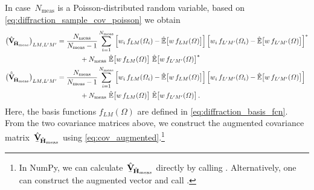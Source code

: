 In case~$N_\text{meas}$ is a Poisson-distributed random variable,
based on \cref{eq:diffraction_sample_cov_poisson} we obtain
\begin{align}
  \rBrk[1]{\covMatEstSym_{\!\hat{\vect{H}}_\text{meas}}}_{L M, L' M'}
  ={}& \frac{N_\text{meas}}{N_\text{meas} - 1} \sum_{i = 1}^{N_\text{meas}}
  \sBrk[2]{w_i\, f_{L M}(\Omega_i) - \exptValEst[1]{w\, f_{L M}(\Omega)}} \sBrk[2]{w_i\, f_{L' M'}(\Omega_i) - \exptValEst[1]{w\, f_{L' M'}(\Omega)}}^*
  \nonumber \\
  \label{eq:diffraction_sample_cov_poisson_hermit_meas}
  {}&\qquad + N_\text{meas}\, \exptValEst[1]{w\, f_{L M}(\Omega)}\, \exptValEst[1]{w\, f_{L' M'}(\Omega)}^*
  \\
  \rBrk[1]{\hat{\tilde{\covMatSym}}_{\!\hat{\vect{H}}_\text{meas}}}_{L M, L' M'}
  ={}& \frac{N_\text{meas}}{N_\text{meas} - 1} \sum_{i = 1}^{N_\text{meas}}
  \sBrk[2]{w_i\, f_{L M}(\Omega_i) - \exptValEst[1]{w\, f_{L M}(\Omega)}} \sBrk[2]{w_i\, f_{L' M'}(\Omega_i) - \exptValEst[1]{w\, f_{L' M'}(\Omega)}}
  \nonumber \\
  \label{eq:diffraction_sample_cov_poisson_pseudo_meas}
  {}&\qquad + N_\text{meas}\, \exptValEst[1]{w\, f_{L M}(\Omega)}\, \exptValEst[1]{w\, f_{L' M'}(\Omega)}.
\end{align}
Here, the basis functions $f_{L M}(\Omega)$ are defined in
\cref{eq:diffraction_basis_fcn}.  From the two covariance matrices
above, we construct the augmented covariance
matrix~$\hat{\underaccent{\bar}{\covMatSym}}_{\!\hat{\vect{H}}_\text{meas}}$
using \cref{eq:cov_augmented}.\footnote{\label{fn:cov_aug_numpy}In
NumPy, we can
calculate~$\hat{\underaccent{\bar}{\covMatSym}}_{\!\hat{\vect{H}}_\text{meas}}$
directly by calling .  Alternatively, one can construct the
augmented vector  and call .}

